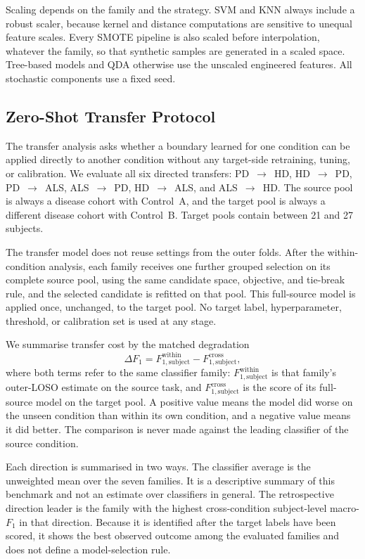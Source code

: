 \documentclass[conference]{IEEEtran}
\begin{document}
Scaling depends on the family and the strategy. SVM and KNN always include a robust scaler, because kernel and distance computations are sensitive to unequal feature scales. Every SMOTE pipeline is also scaled before interpolation, whatever the family, so that synthetic samples are generated in a scaled space. Tree-based models and QDA otherwise use the unscaled engineered features. All stochastic components use a fixed seed.

\subsection{Zero-Shot Transfer Protocol}
\label{sec:method-transfer}
The transfer analysis asks whether a boundary learned for one condition can be applied directly to another condition without any target-side retraining, tuning, or calibration. We evaluate all six directed transfers: PD~$\rightarrow$~HD, HD~$\rightarrow$~PD, PD~$\rightarrow$~ALS, ALS~$\rightarrow$~PD, HD~$\rightarrow$~ALS, and ALS~$\rightarrow$~HD. The source pool is always a disease cohort with Control~A, and the target pool is always a different disease cohort with Control~B. Target pools contain between 21 and 27 subjects.

The transfer model does not reuse settings from the outer folds. After the within-condition analysis, each family receives one further grouped selection on its complete source pool, using the same candidate space, objective, and tie-break rule, and the selected candidate is refitted on that pool. This full-source model is applied once, unchanged, to the target pool. No target label, hyperparameter, threshold, or calibration set is used at any stage.

We summarise transfer cost by the matched degradation
\begin{equation}
\Delta F_1 = F_{1,\mathrm{subject}}^{\mathrm{within}} - F_{1,\mathrm{subject}}^{\mathrm{cross}},
\label{eq:matched-degradation}
\end{equation}
where both terms refer to the same classifier family: $F_{1,\mathrm{subject}}^{\mathrm{within}}$ is that family's outer-LOSO estimate on the source task, and $F_{1,\mathrm{subject}}^{\mathrm{cross}}$ is the score of its full-source model on the target pool. A positive value means the model did worse on the unseen condition than within its own condition, and a negative value means it did better. The comparison is never made against the leading classifier of the source condition.

Each direction is summarised in two ways. The classifier average is the unweighted mean over the seven families. It is a descriptive summary of this benchmark and not an estimate over classifiers in general. The retrospective direction leader is the family with the highest cross-condition subject-level macro-$F_1$ in that direction. Because it is identified after the target labels have been scored, it shows the best observed outcome among the evaluated families and does not define a model-selection rule.
\end{document}
